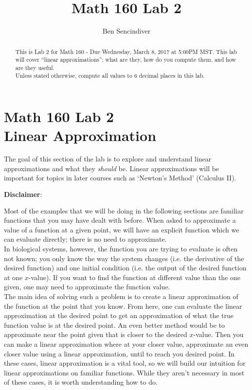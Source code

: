 \documentclass[handout,nooutcomes]{ximera}
\title{Math 160 Lab 2}
\author{Ben Sencindiver} %
\begin{document}
\section{Math 160 Lab 2 \\ Linear Approximation}

\begin{abstract}
This is Lab 2 for Math 160 - Due Wednesday, March 8, 2017 at 5:00PM MST.
This lab will cover ``linear approximations'': what are they,
how do you compute them, and how are they useful. \\

Unless stated otherwise, compute all values to $6$ decimal places in this lab.
\end{abstract}



\maketitle



The goal of this section of the lab is to explore and understand linear
approximations and what they {\it should} be. Linear approximations will
be important for topics in later courses such as `Newton's Method' (Calculus II).

\textbf{Disclaimer}:

Most of the examples that we will be doing in the following sections
are familiar functions that you may have dealt with before. 
When asked to approximate a value of a function at a given point, 
we will have an explicit function which we can evaluate directly; there
is no need to approximate. \\

In biological systems, however, the function you are trying to evaluate
is often not known; you only know the way the system changes 
(i.e. the derivative of the desired function) and one initial condition
(i.e. the output of the desired function at one $x$-value). If you want
to find the function at different value than the one given,
one may need to approximate the function value.\\

The main idea of solving such a problem is to create a 
linear approximation of the function at the point that you know. From here,
one can evaluate the linear approximation at the desired point to get an
approximation of what the true function value is at the desired point. 
An even better method would be to approximate near the point given that
is closer to the desired $x$-value. Then you can make a linear approximation
where at your closer value, approximate an even closer value using a linear
approximation, until to reach you desired point. In these cases, linear
approximation is a vital tool, so we will build our intuition for linear
approximations on familiar functions. While they aren't necessary in most
of these cases, it is worth understanding how to do.\\
\end{document}
